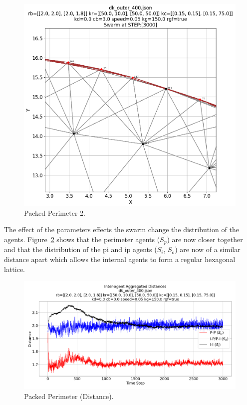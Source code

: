 \documentclass[12pt,a4paper]{IEEEtran}
\begin{document}
\begin{figure}[H]
	\begin{center}
		\includegraphics[width=1.0\linewidth]{figures/outer2}
	\end{center}
	\caption{Packed Perimeter 2. \label{fig:tightPerim2}}
\end{figure}

The effect of the parameters effects the swarm change the distribution of the agents. Figure~\ref{fig:tightPerimDistance} shows that the perimeter agents ($S_{p}$) are now closer together and that the distribution of the p\textrightarrow i and i\textrightarrow p agents ($S_{i}$, $S_{o}$) are now of a similar distance apart which allows the internal agents to form a regular hexagonal lattice.

\begin{figure}[H]
	\begin{center}
		\includegraphics[width=1.0\linewidth]{figures/outerDistance}
	\end{center}
	\caption{Packed Perimeter (Distance). \label{fig:tightPerimDistance}}
\end{figure}
\end{document}
